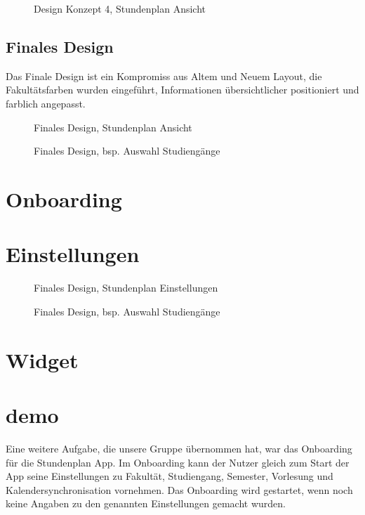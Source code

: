 \begin{figure}[H]
	\centering
	\caption{Design Konzept 4,  Stundenplan Ansicht}
	\label{fig1}
\end{figure}
\subsection{Finales Design}
Das Finale Design ist ein Kompromiss aus Altem und Neuem Layout, die Fakultätsfarben wurden eingeführt, Informationen übersichtlicher positioniert und farblich angepasst.

\begin{figure}[H]
	\centering
	\caption{Finales Design, Stundenplan Ansicht}
	\label{fig1}
\end{figure}

\begin{figure}[H]
	\centering
	\caption{Finales Design, bsp. Auswahl Studiengänge}
	\label{fig1}
\end{figure}




\section{Onboarding}
\section{Einstellungen}
\begin{figure}[H]
	\centering
	\caption{Finales Design, Stundenplan Einstellungen}
	\label{fig1}
\end{figure}

\begin{figure}[H]
	\centering
	\caption{Finales Design, bsp. Auswahl Studiengänge}
	\label{fig1}
\end{figure}

\section{Widget}

\section{demo}
Eine weitere Aufgabe, die unsere Gruppe übernommen hat, war das Onboarding für die Stundenplan App. Im Onboarding kann der Nutzer gleich zum Start der App seine Einstellungen zu Fakultät, Studiengang, Semester, Vorlesung und Kalendersynchronisation vornehmen. Das Onboarding wird gestartet, wenn noch keine Angaben zu den genannten Einstellungen gemacht wurden.

